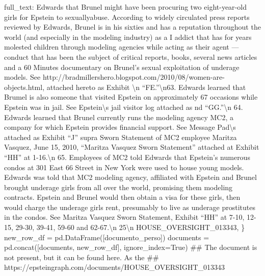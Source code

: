 \documentclass[
  italian,
  a4paper,
]{article}
\newenvironment{Shaded}{\begin{snugshade}}{\end{snugshade}}
\newcommand{\CharTok}[1]{\textcolor[rgb]{0.13,0.47,0.30}{#1}}
\newcommand{\CommentTok}[1]{\textcolor[rgb]{0.37,0.37,0.37}{#1}}
\newcommand{\NormalTok}[1]{\textcolor[rgb]{0.00,0.23,0.31}{#1}}
\newcommand{\OperatorTok}[1]{\textcolor[rgb]{0.37,0.37,0.37}{#1}}
\newcommand{\StringTok}[1]{\textcolor[rgb]{0.13,0.47,0.30}{#1}}
\newcommand{\VariableTok}[1]{\textcolor[rgb]{0.07,0.07,0.07}{#1}}
\begin{document}
\begin{Shaded}
\begin{Highlighting}[]
    \StringTok{\textquotesingle{}full\_text\textquotesingle{}}\NormalTok{: }\StringTok{\textquotesingle{}Edwards that Brunel might have been procuring two eight{-}year{-}old girls for Epstein to sexuallyabuse. According to widely circulated press reports reviewed by Edwards, Brunel is in his sixties and has a reputation throughout the world (and especially in the modeling industry) as a I addict that has for years molested children through modeling agencies while acting as their agent — conduct that has been the subject of critical reports, books, several news articles and a 60 Minutes documentary on Brunel’s sexual exploitation of underage models. See http://bradmillershero.blogspot.com/2010/08/women{-}are{-}objects.html, attached hereto as Exhibit }\CharTok{\textbackslash{}n}\StringTok{ “FE.”}\CharTok{\textbackslash{}n}\StringTok{63. Edwards learned that Brumel is also someone that visited Epstein on approximately 67 occasions while Epstein was in jail. See Epstein}\CharTok{\textbackslash{}\textquotesingle{}}\StringTok{s jail visitor log attached as nd “GG.”}\CharTok{\textbackslash{}n}\StringTok{ 64. Edwards learned that Brunel currently runs the modeling agency MC2, a company for which Epstein provides financial support. See Message Pad}\CharTok{\textbackslash{}\textquotesingle{}}\StringTok{s attached as Exhibit “J” supra Sworn Statement of MC2 employee Maritza Vasquez, June 15, 2010, “Maritza Vasquez Sworn Statement” attached at Exhibit “HH” at 1{-}16.}\CharTok{\textbackslash{}n}\StringTok{ 65. Employees of MC2 told Edwards that Epstein’s numerous condos at 301 East 66 Street in New York were used to house young models. Edwards was told that MC2 modeling agency, affiliated with Epstein and Brunel brought underage girls from all over the world, promising them modeling contracts. Epstein and Brunel would then obtain a visa for these girls, then would charge the underage girls rent, presumably to live as underage prostitutes in the condos. See Maritza Vasquez Sworn Statement, Exhibit “HH” at 7{-}10, 12{-}15, 29{-}30, 39{-}41, 59{-}60 and 62{-}67.}\CharTok{\textbackslash{}n}\StringTok{ 25}\CharTok{\textbackslash{}n}\StringTok{ HOUSE\_OVERSIGHT\_013343\textquotesingle{}}\NormalTok{, }
\NormalTok{\}}
\NormalTok{new\_row\_df }\OperatorTok{=}\NormalTok{ pd.DataFrame([documento\_perso])}
\NormalTok{documents }\OperatorTok{=}\NormalTok{ pd.concat([documents, new\_row\_df], ignore\_index}\OperatorTok{=}\VariableTok{True}\NormalTok{)}
\CommentTok{\#\# The document is not present, but it can be found here. As the }
\CommentTok{\#\# https://epsteingraph.com/documents/HOUSE\_OVERSIGHT\_013343}

\end{Highlighting}
\end{Shaded}
\end{document}
